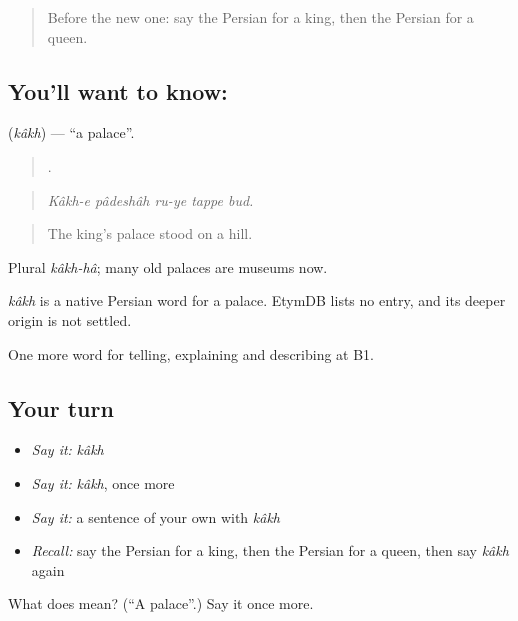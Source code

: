 \begin{quote}
Before the new one: say the Persian for a king, then the Persian for a queen.
\end{quote}

\subsection*{You'll want to know: }
\textbf{} (\emph{kâkh}) — \textquotedblleft{}a palace\textquotedblright{}.

\begin{quote}
    .
\end{quote}

\begin{quote}
\emph{Kâkh-e pâdeshâh ru-ye tappe bud.}
\end{quote}

\begin{quote}
The king's palace stood on a hill.
\end{quote}

Plural \emph{kâkh-hâ}; many old palaces are museums now.

\begin{cousinweb}
\emph{kâkh} is a native Persian word for a palace. EtymDB lists no entry, and its deeper origin is not settled.
\end{cousinweb}

\begin{grammarlens}[title={What you've built}]
One more word for telling, explaining and describing at B1.
\end{grammarlens}

\subsection*{Your turn}
\begin{itemize}
\raggedright
  \item \emph{Say it:} \emph{kâkh}
  \item \emph{Say it:} \emph{kâkh}, once more
  \item \emph{Say it:} a sentence of your own with \emph{kâkh}
  \item \emph{Recall:} say the Persian for a king, then the Persian for a queen, then say \emph{kâkh} again
\end{itemize}

\begin{tcolorbox}[breakable,colback=teal!4,colframe=teal!35!black,title={Before you move on}]
What does  mean? (\textquotedblleft{}A palace\textquotedblright{}.) Say it once more.
\end{tcolorbox}
